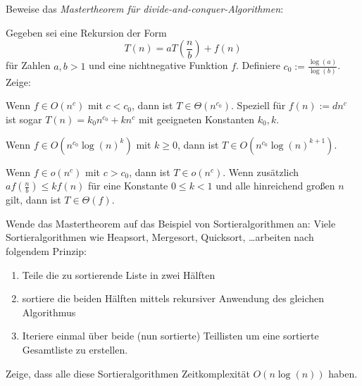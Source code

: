 
\begin{sheet}

    \begin{problem}[title={Mastertheorem}]
        \label{ex:mastertheorem}
        Beweise das \emph{Mastertheorem für divide-and-conquer-Algorithmen}:

        Gegeben sei eine Rekursion der Form
        \[T(n) = a T\left(\frac{n}{b}\right) + f(n)\]
        für Zahlen $a,b>1$ und eine nichtnegative Funktion $f$. Definiere $c_0 := \frac{\log(a)}{\log(b)}$. Zeige:
        \begin{subproblem}[difficulty={leicht}]
            Wenn $f\in O(n^c)$ mit $c<c_0$, dann ist $T\in\Theta(n^{c_0})$. Speziell für $f(n) := d n^c$ ist sogar $T(n) = k_0 n^{c_0} + k n^c$ mit geeigneten Konstanten $k_0,k$.
        \end{subproblem}
        \begin{subproblem}[difficulty={leicht}]
            Wenn $f\in O(n^{c_0}\log(n)^k)$ mit $k\geq 0$, dann ist $T\in O(n^{c_0} \log(n)^{k+1})$.
        \end{subproblem}
        \begin{subproblem}[difficulty={mittel}]
            Wenn $f\in o(n^c)$ mit $c>c_0$, dann ist $T\in o(n^c)$. Wenn zusätzlich $a f(\frac{n}{b})\leq k f(n)$ für eine Konstante $0\leq k<1$ und alle hinreichend großen $n$ gilt, dann ist $T\in\Theta(f)$.
        \end{subproblem}
    \end{problem}

    \begin{problem}
        Wende das Mastertheorem auf das Beispiel von Sortieralgorithmen an: Viele Sortieralgorithmen wie Heapsort, Mergesort, Quicksort, \ldots arbeiten nach folgendem Prinzip:
        \begin{enumerate}
            \item Teile die zu sortierende Liste in zwei Hälften
            \item sortiere die beiden Hälften mittels rekursiver Anwendung des gleichen Algorithmus
            \item Iteriere einmal über beide (nun sortierte) Teillisten um eine sortierte Gesamtliste zu erstellen.
        \end{enumerate}
        Zeige, dass alle diese Sortieralgorithmen Zeitkomplexität $O(n\log(n))$ haben.
    \end{problem}


\end{sheet}
